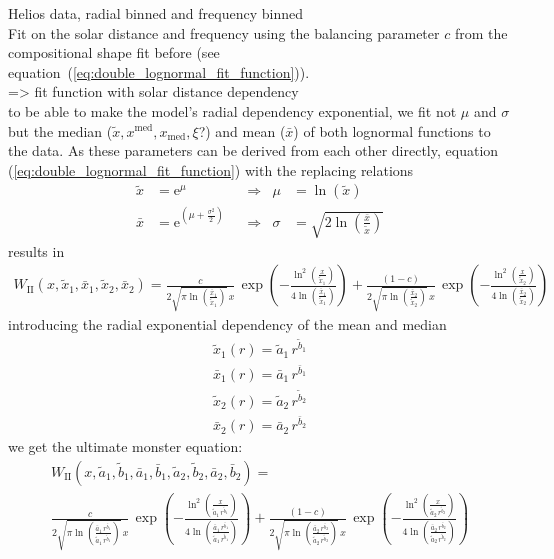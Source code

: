 Helios data, radial binned and frequency binned\\
Fit on the solar distance and frequency using the balancing parameter $c$ from the compositional shape fit before (see equation~(\ref{eq:double_lognormal_fit_function})).\\
=> fit function with solar distance dependency\\
to be able to make the model's radial dependency exponential, we fit not $\mu$ and $\sigma$ but the median ($\tilde{x}, x^\text{med}, x_\text{med}, \xi$?) and mean ($\bar{x}$) of both lognormal functions to the data. As these parameters can be derived from each other directly, equation (\ref{eq:double_lognormal_fit_function}) with the replacing relations\\
\begin{align}
	\tilde{x} &= \text{e}^{\mu}	&	&\Longrightarrow	&	\mu &= \ln(\tilde{x})\\
	\bar{x} &= \text{e}^{(\mu + \frac{\sigma^2}{2})}	&	&\Longrightarrow	&	\sigma &= \sqrt{2 \ln\left(\frac{\bar{x}}{\tilde{x}}\right)}
\end{align}
results in
\begin{align}
	W_\text{II}(x,\tilde{x}_1,\bar{x}_1,\tilde{x}_2,\bar{x}_2) = \frac{c}{2 \sqrt{\pi \ln\left(\frac{\bar{x}_1}{\tilde{x}_1}\right)} \, x} \, \exp\left(- \frac{\ln^2\left(\frac{x}{\tilde{x}_1}\right)}{4 \ln\left(\frac{\bar{x}_1}{\tilde{x}_1}\right)}\right) + \frac{(1 - c)}{2 \sqrt{\pi \ln\left(\frac{\bar{x}_2}{\tilde{x}_2}\right)} \, x} \, \exp\left(- \frac{\ln^2\left(\frac{x}{\tilde{x}_2}\right)}{4 \ln\left(\frac{\bar{x}_2}{\tilde{x}_2}\right)}\right)
\end{align}
introducing the radial exponential dependency of the mean and median\\
\begin{align}
	\tilde{x}_1(r) = \tilde{a}_1 \, r^{\tilde{b}_1}\\
	\bar{x}_1(r) = \bar{a}_1 \, r^{\bar{b}_1}\\
	\tilde{x}_2(r) = \tilde{a}_2 \, r^{\tilde{b}_2}\\
	\bar{x}_2(r) = \bar{a}_2 \, r^{\bar{b}_2}
\end{align}
we get the ultimate monster equation:\\
\begin{align}
	W_\text{II}(x,\tilde{a}_1, \tilde{b}_1, \bar{a}_1, \bar{b}_1, \tilde{a}_2, \tilde{b}_2, \bar{a}_2, \bar{b}_2) =\\
	\frac{c}{2 \sqrt{\pi \ln\left(\frac{\bar{a}_1 \, r^{\bar{b}_1}}{\tilde{a}_1 \, r^{\tilde{b}_1}}\right)} \, x} \, \exp\left(- \frac{\ln^2\left(\frac{x}{\tilde{a}_1 \, r^{\tilde{b}_1}}\right)}{4 \ln\left(\frac{\bar{a}_1 \, r^{\bar{b}_1}}{\tilde{a}_1 \, r^{\tilde{b}_1}}\right)}\right) + \frac{(1 - c)}{2 \sqrt{\pi \ln\left(\frac{\bar{a}_2 \, r^{\bar{b}_2}}{\tilde{a}_2 \, r^{\tilde{b}_2}}\right)} \, x} \, \exp\left(- \frac{\ln^2\left(\frac{x}{\tilde{a}_2 \, r^{\tilde{b}_2}}\right)}{4 \ln\left(\frac{\bar{a}_2 \, r^{\bar{b}_2}}{\tilde{a}_2 \, r^{\tilde{b}_2}}\right)}\right)
\end{align}




